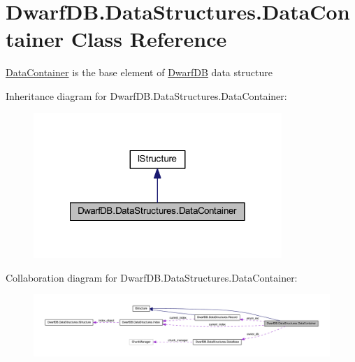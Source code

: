\hypertarget{class_dwarf_d_b_1_1_data_structures_1_1_data_container}{\section{Dwarf\+D\+B.\+Data\+Structures.\+Data\+Container Class Reference}
\label{class_dwarf_d_b_1_1_data_structures_1_1_data_container}
}


\hyperlink{class_dwarf_d_b_1_1_data_structures_1_1_data_container}{Data\+Container} is the base element of \hyperlink{namespace_dwarf_d_b}{Dwarf\+D\+B} data structure  




Inheritance diagram for Dwarf\+D\+B.\+Data\+Structures.\+Data\+Container\+:
\nopagebreak
\begin{figure}[H]
\begin{center}
\leavevmode
\includegraphics[width=266pt]{class_dwarf_d_b_1_1_data_structures_1_1_data_container__inherit__graph}
\end{center}
\end{figure}


Collaboration diagram for Dwarf\+D\+B.\+Data\+Structures.\+Data\+Container\+:
\nopagebreak
\begin{figure}[H]
\begin{center}
\leavevmode
\includegraphics[width=350pt]{class_dwarf_d_b_1_1_data_structures_1_1_data_container__coll__graph}
\end{center}
\end{figure}
